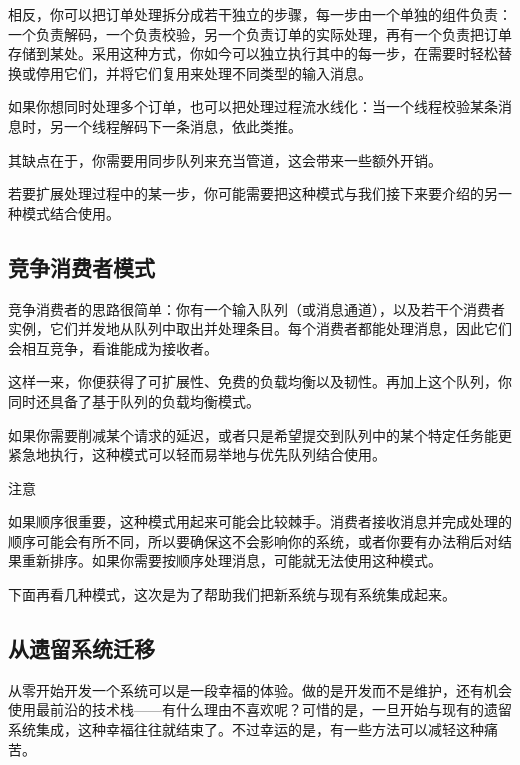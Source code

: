 \label{idx:360}
\label{idx:361}
相反，你可以把订单处理拆分成若干独立的步骤，每一步由一个单独的组件负责：一个负责解码，一个负责校验，另一个负责订单的实际处理，再有一个负责把订单存储到某处。采用这种方式，你如今可以独立执行其中的每一步，在需要时轻松替换或停用它们，并将它们复用来处理不同类型的输入消息。

如果你想同时处理多个订单，也可以把处理过程流水线化：当一个线程校验某条消息时，另一个线程解码下一条消息，依此类推。

其缺点在于，你需要用同步队列来充当管道，这会带来一些额外开销。

若要扩展处理过程中的某一步，你可能需要把这种模式与我们接下来要介绍的另一种模式结合使用。

\subsection{竞争消费者模式}

\label{idx:362}
\label{idx:363}
竞争消费者的思路很简单：你有一个输入队列（或消息通道），以及若干个消费者实例，它们并发地从队列中取出并处理条目。每个消费者都能处理消息，因此它们会相互竞争，看谁能成为接收者。


这样一来，你便获得了可扩展性、免费的负载均衡以及韧性。再加上这个队列，你同时还具备了基于队列的负载均衡模式。

如果你需要削减某个请求的延迟，或者只是希望提交到队列中的某个特定任务能更紧急地执行，这种模式可以轻而易举地与优先队列结合使用。

\begin{myNotic}{注意}

如果顺序很重要，这种模式用起来可能会比较棘手。消费者接收消息并完成处理的顺序可能会有所不同，所以要确保这不会影响你的系统，或者你要有办法稍后对结果重新排序。如果你需要按顺序处理消息，可能就无法使用这种模式。
\end{myNotic}

\label{idx:364}
\label{idx:365}
下面再看几种模式，这次是为了帮助我们把新系统与现有系统集成起来。

\subsection{从遗留系统迁移}

\label{idx:366}
从零开始开发一个系统可以是一段幸福的体验。做的是开发而不是维护，还有机会使用最前沿的技术栈——有什么理由不喜欢呢？可惜的是，一旦开始与现有的遗留系统集成，这种幸福往往就结束了。不过幸运的是，有一些方法可以减轻这种痛苦。

